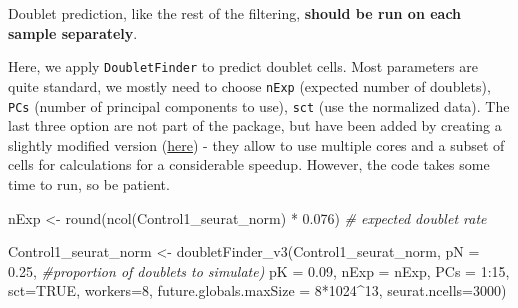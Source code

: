 \documentclass[
  letterpaper,
  DIV=11,
  numbers=noendperiod]{scrartcl}
\newenvironment{Shaded}{}{}
\newcommand{\AttributeTok}[1]{\textcolor[rgb]{0.49,0.56,0.16}{#1}}
\newcommand{\CommentTok}[1]{\textcolor[rgb]{0.38,0.63,0.69}{\textit{#1}}}
\newcommand{\ConstantTok}[1]{\textcolor[rgb]{0.53,0.00,0.00}{#1}}
\newcommand{\DecValTok}[1]{\textcolor[rgb]{0.25,0.63,0.44}{#1}}
\newcommand{\FloatTok}[1]{\textcolor[rgb]{0.25,0.63,0.44}{#1}}
\newcommand{\FunctionTok}[1]{\textcolor[rgb]{0.02,0.16,0.49}{#1}}
\newcommand{\NormalTok}[1]{#1}
\newcommand{\OtherTok}[1]{\textcolor[rgb]{0.00,0.44,0.13}{#1}}
\newcommand{\SpecialCharTok}[1]{\textcolor[rgb]{0.25,0.44,0.63}{#1}}
\begin{document}
\begin{tcolorbox}[enhanced jigsaw, arc=.35mm, opacityback=0, coltitle=black, toprule=.15mm, opacitybacktitle=0.6, titlerule=0mm, colbacktitle=quarto-callout-note-color!10!white, left=2mm, breakable, bottomtitle=1mm, title=\textcolor{quarto-callout-note-color}{\faInfo}\hspace{0.5em}{Note}, toptitle=1mm, colframe=quarto-callout-note-color-frame, leftrule=.75mm, rightrule=.15mm, bottomrule=.15mm, colback=white]

Doublet prediction, like the rest of the filtering, \textbf{should be
run on each sample separately}.

\end{tcolorbox}

Here, we apply \texttt{DoubletFinder} to predict doublet cells. Most
parameters are quite standard, we mostly need to choose \texttt{nExp}
(expected number of doublets), \texttt{PCs} (number of principal
components to use), \texttt{sct} (use the normalized data). The last
three option are not part of the package, but have been added by
creating a slightly modified version
(\href{https://github.com/SamueleSoraggi/DoubletFinder}{here}) - they
allow to use multiple cores and a subset of cells for calculations for a
considerable speedup. However, the code takes some time to run, so be
patient.

\begin{Shaded}
\begin{Highlighting}[]
\NormalTok{nExp }\OtherTok{\textless{}{-}} \FunctionTok{round}\NormalTok{(}\FunctionTok{ncol}\NormalTok{(Control1\_seurat\_norm) }\SpecialCharTok{*} \FloatTok{0.076}\NormalTok{)  }\CommentTok{\# expected doublet rate}
\end{Highlighting}
\end{Shaded}

\begin{Shaded}
\begin{Highlighting}[]
\NormalTok{Control1\_seurat\_norm }\OtherTok{\textless{}{-}} \FunctionTok{doubletFinder\_v3}\NormalTok{(Control1\_seurat\_norm,}
                                                  \AttributeTok{pN =} \FloatTok{0.25}\NormalTok{, }\CommentTok{\#proportion of doublets to simulate)}
                                                  \AttributeTok{pK =} \FloatTok{0.09}\NormalTok{, }
                                                  \AttributeTok{nExp =}\NormalTok{ nExp, }
                                                  \AttributeTok{PCs =} \DecValTok{1}\SpecialCharTok{:}\DecValTok{15}\NormalTok{, }
                                                  \AttributeTok{sct=}\ConstantTok{TRUE}\NormalTok{, }
                                                  \AttributeTok{workers=}\DecValTok{8}\NormalTok{, }
                                                  \AttributeTok{future.globals.maxSize =} \DecValTok{8}\SpecialCharTok{*}\DecValTok{1024}\SpecialCharTok{\^{}}\DecValTok{13}\NormalTok{,}
                                                  \AttributeTok{seurat.ncells=}\DecValTok{3000}\NormalTok{)}
\end{Highlighting}
\end{Shaded}
\end{document}
